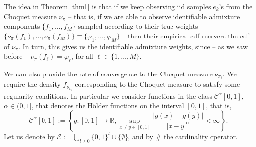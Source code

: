 \documentclass[12pt, reqno]{amsart}
\theoremstyle{definition}
\begin{document}
The idea in Theorem \ref{thm1} is that if we keep observing iid samples $e_k$'s from the Choquet measure $\nu_{\pi}$ -- that is, if we are able to observe identifiable admixture components $\{f_1,\ldots,f_M\}$ sampled according to their true weights $\{\nu_{\pi}(f_1),\ldots,\nu_{\pi}(f_M)\}\equiv\{\varphi_{1},\ldots,\varphi_{M}\}$ -- then their empirical cdf recovers the cdf of $\nu_{\pi}$. In turn, this gives us the identifiable admixture weights, since -- as we saw before -- $\nu_{\pi}(f_\ell)=\varphi_{\ell}$, for all $\ell\in\{1,\ldots,M\}$.





\iffalse
We can also provide the rate of convergence to the Choquet measure $\nu_{\pi_i}$. We require the density $f_{\nu_{\pi_i}}$ corresponding to the Choquet measure to satisfy some regularity conditions. In particular we  consider functions in the class 
$\mathcal{C}^\alpha[0,1]$, $\alpha \in (0,1]$, that denotes the H\"older functions on the interval $[0,1]$, that is, 
$$\mathcal{C}^\alpha[0,1]:= \left\lbrace{ g:[0,1] \rightarrow \mathbb{R} , \sup\limits_{x \neq y \in [0,1]} \frac{|g(x)-g(y)|}{|x-y|^\alpha} < \infty }\right\rbrace \text{.}$$
Let us denote by $\mathcal{E}:=\bigcup_{l \geq 0} \{0,1\}^l \cup \{\emptyset\}$, and by $\#$ the cardinality operator.
\end{document}

